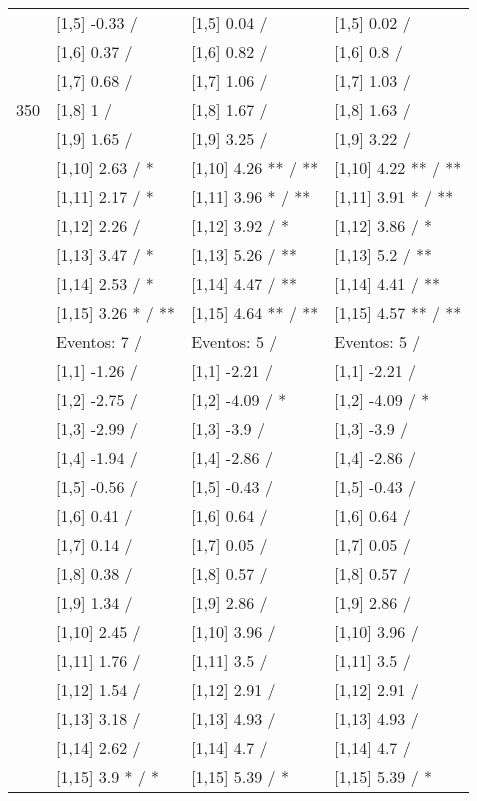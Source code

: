 \begin{table}
\begin{tabular}[t]{llll}
 & {}[1,5] -0.33  / & {}[1,5] 0.04  / & {}[1,5] 0.02  /\\
 & {}[1,6] 0.37  / & {}[1,6] 0.82  / & {}[1,6] 0.8  /\\
 & {}[1,7] 0.68  / & {}[1,7] 1.06  / & {}[1,7] 1.03  /\\
350 & {}[1,8] 1  / & {}[1,8] 1.67  / & {}[1,8] 1.63  /\\
\addlinespace
 & {}[1,9] 1.65  / & {}[1,9] 3.25  / & {}[1,9] 3.22  /\\
 & {}[1,10] 2.63  / * & {}[1,10] 4.26 ** / ** & {}[1,10] 4.22 ** / **\\
 & {}[1,11] 2.17  / * & {}[1,11] 3.96 * / ** & {}[1,11] 3.91 * / **\\
 & {}[1,12] 2.26  / & {}[1,12] 3.92  / * & {}[1,12] 3.86  / *\\
 & {}[1,13] 3.47  / * & {}[1,13] 5.26  / ** & {}[1,13] 5.2  / **\\
\addlinespace
 & {}[1,14] 2.53  / * & {}[1,14] 4.47  / ** & {}[1,14] 4.41  / **\\
 & {}[1,15] 3.26 * / ** & {}[1,15] 4.64 ** / ** & {}[1,15] 4.57 ** / **\\
 & Eventos:  7 / & Eventos:  5 / & Eventos:  5 /\\
 & {}[1,1] -1.26  / & {}[1,1] -2.21  / & {}[1,1] -2.21  /\\
 & {}[1,2] -2.75  / & {}[1,2] -4.09  / * & {}[1,2] -4.09  / *\\
\addlinespace
 & {}[1,3] -2.99  / & {}[1,3] -3.9  / & {}[1,3] -3.9  /\\
 & {}[1,4] -1.94  / & {}[1,4] -2.86  / & {}[1,4] -2.86  /\\
 & {}[1,5] -0.56  / & {}[1,5] -0.43  / & {}[1,5] -0.43  /\\
 & {}[1,6] 0.41  / & {}[1,6] 0.64  / & {}[1,6] 0.64  /\\
 & {}[1,7] 0.14  / & {}[1,7] 0.05  / & {}[1,7] 0.05  /\\
\addlinespace
500 & {}[1,8] 0.38  / & {}[1,8] 0.57  / & {}[1,8] 0.57  /\\
 & {}[1,9] 1.34  / & {}[1,9] 2.86  / & {}[1,9] 2.86  /\\
 & {}[1,10] 2.45  / & {}[1,10] 3.96  / & {}[1,10] 3.96  /\\
 & {}[1,11] 1.76  / & {}[1,11] 3.5  / & {}[1,11] 3.5  /\\
 & {}[1,12] 1.54  / & {}[1,12] 2.91  / & {}[1,12] 2.91  /\\
\addlinespace
 & {}[1,13] 3.18  / & {}[1,13] 4.93  / & {}[1,13] 4.93  /\\
 & {}[1,14] 2.62  / & {}[1,14] 4.7  / & {}[1,14] 4.7  /\\
 & {}[1,15] 3.9 * / * & {}[1,15] 5.39  / * & {}[1,15] 5.39  / *\\
\bottomrule
\end{tabular}
\end{table}
